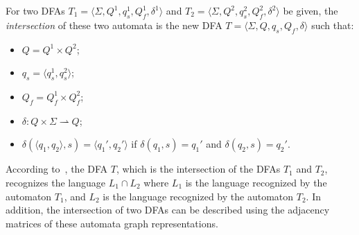 \begin{definition}\label{def:FAintersection}
For two DFAs $T_1 = \langle \Sigma, Q^1, q_s^1, Q_f^1, \delta^1 \rangle$ and $T_2 = \langle \Sigma, Q^2, q_s^2, Q_f^2, \delta^2 \rangle$ be given, the \textit{intersection} of these two automata is the new DFA $T = \langle \Sigma, Q, q_s, Q_f, \delta \rangle$ such that:
\begin{itemize}
    \item $Q = Q^1 \times Q^2$;
    \item $q_s = \langle q_s^1, q_s^2 \rangle$;
    \item $Q_f = Q_f^1 \times Q_f^2$;
    \item $\delta: Q \times \Sigma \rightharpoonup Q$;
    \item $\delta (\langle q_1, q_2 \rangle, s) = \langle q_1', q_2' \rangle$ if $\delta(q_1, s)=q_1'$ and $\delta(q_2, s)=q_2'$.
\end{itemize}
\end{definition}

According to~\cite{hopcroft2001introduction}, the DFA $T$, which is the intersection of the DFAs $T_1$ and $T_2$, recognizes the language $L_1 \cap L_2$ where $L_1$ is the language recognized by the automaton $T_1$, and $L_2$ is the language recognized by the automaton $T_2$. In addition, the intersection of two DFAs can be described using the adjacency matrices of these automata graph representations.

